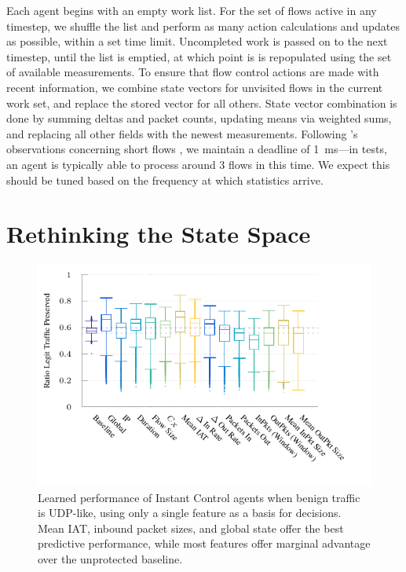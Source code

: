 \documentclass[10pt, times, comsoc]{IEEEtran}
\begin{document}
Each agent begins with an empty work list.
For the set of flows active in any timestep, we shuffle the list and perform as many action calculations and updates as possible, within a set time limit.
Uncompleted work is passed on to the next timestep, until the list is emptied, at which point is is repopulated using the set of available measurements.
To ensure that flow control actions are made with recent information, we combine state vectors for unvisited flows in the current work set, and replace the stored vector for all others.
State vector combination is done by summing deltas and packet counts, updating means via weighted sums, and replacing all other fields with the newest measurements.
Following \citeauthor{DBLP:conf/sigcomm/ChenL0L18}'s observations concerning short flows \cite{DBLP:conf/sigcomm/ChenL0L18}, we maintain a deadline of \SI{1}{\milli\second}---in tests, an agent is typically able to process around 3 flows in this time.
We expect this should be tuned based on the frequency at which statistics arrive.

\section{Rethinking the State Space}\label{sec:rethinking-the-state-space}

\begin{figure}
	\centering
	\includegraphics[width=0.9\linewidth]{../plots/ftprep-cap-box}
	\vspace{-1cm}
	\caption{
		Learned performance of Instant Control agents when benign traffic is UDP-like, using only a single feature as a basis for decisions.
		Mean IAT, inbound packet sizes, and global state offer the best predictive performance, while most features offer marginal advantage over the unprotected baseline.
		\label{fig:udp-feature-plots}
	}
\end{figure}
\end{document}
